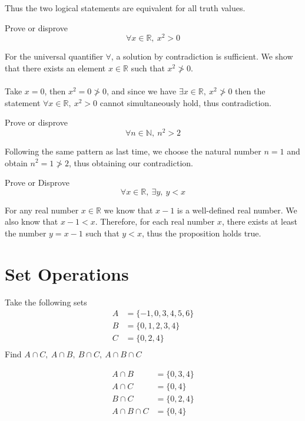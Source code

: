 \documentclass[a4paper]{article}
\begin{document}
Thus the two logical statements are equivalent for all truth values.
\begin{question}{}{}
Prove or disprove
\[
\forall x \in \mathbb{R}, \ x^2 > 0
\]
\end{question}

For the universal quantifier \(\forall\), a solution by contradiction is sufficient. We show that there exists an element \(x \in \mathbb{R}\) such that \(x^2 \ngtr 0\). 
\\ \\
Take \(x = 0\), then \(x^2 = 0 \ngtr 0\), and since we have \(\exists x \in \mathbb{R} , \ x^2 \ngtr 0\) then the statement \(\forall x \in \mathbb{R}, \ x^2 > 0\) cannot simultaneously hold, thus contradiction.


\begin{question}{}{}
Prove or disprove
\[
\forall n \in \mathbb{N}, \ n^2 > 2
\]
\end{question}

Following the same pattern as last time, we choose the natural number \(n=1\) and obtain \(n^2 = 1 \ngtr 2\), thus obtaining our contradiction.


\begin{question}{}{} Prove or Disprove
\[
\forall x \in \mathbb{R}, \ \exists y, \ y< x
\]
\end{question}

For any real number \(x \in \mathbb{R}\) we know that \(x-1\) is a well-defined real number. We also know that \(x-1 < x\). Therefore, for each real number \(x\), there exists at least the number \(y = x-1\) such that \(y < x\), thus the proposition holds true.


\section{Set Operations}
\begin{question}{}{}
Take the following sets
\begin{align*}
A &= \{-1, 0, 3, 4, 5, 6\} \\
B &= \{0, 1, 2, 3, 4\} \\
C &= \{0,2,4\} \\ 
\end{align*}
Find
\(A \cap C, \ A \cap B,  \ B \cap C, \ A \cap B \cap C\)
\end{question}

\begin{align*}
A \cap B &= \{0,3,4\} \\
A \cap C &= \{0,4\} \\
B \cap C &= \{0,2,4\} \\
A \cap B \cap C &= \{0, 4\}
\end{align*}
\end{document}
